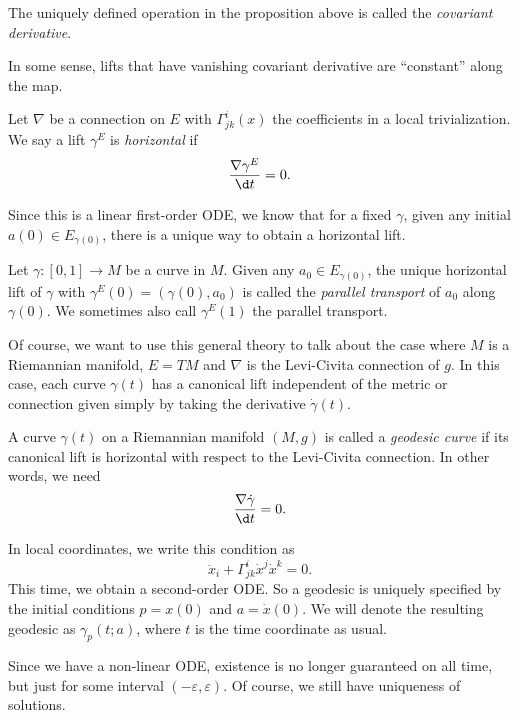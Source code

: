 \documentclass[a4paper]{article}
\begin{document}
\begin{defi}
  The uniquely defined operation in the proposition above is called the \emph{covariant derivative}.
\end{defi}

In some sense, lifts that have vanishing covariant derivative are ``constant'' along the map.

\begin{defi}
  Let $\nabla$ be a connection on $E$ with $\Gamma^i_{jk}(x)$ the coefficients in a local trivialization. We say a lift $\gamma^E$ is \emph{horizontal} if
  \[
    \frac{\nabla \gamma^E}{\d t} = 0.
  \]
\end{defi}
Since this is a linear first-order ODE, we know that for a fixed $\gamma$, given any initial $a(0) \in E_{\gamma(0)}$, there is a unique way to obtain a horizontal lift.

\begin{defi}
  Let $\gamma : [0, 1] \to M$ be a curve in $M$. Given any $a_0 \in E_{\gamma(0)}$, the unique horizontal lift of $\gamma$ with $\gamma^E(0) = (\gamma(0), a_0)$ is called the \emph{parallel transport} of $a_0$ along $\gamma(0)$. We sometimes also call $\gamma^E(1)$ the parallel transport.
\end{defi}
Of course, we want to use this general theory to talk about the case where $M$ is a Riemannian manifold, $E = TM$ and $\nabla$ is the Levi-Civita connection of $g$. In this case, each curve $\gamma(t)$ has a canonical lift independent of the metric or connection given simply by taking the derivative $\dot{\gamma}(t)$.
\begin{defi}[Geodesic]
  A curve $\gamma(t)$ on a Riemannian manifold $(M, g)$ is called a \emph{geodesic curve} if its canonical lift is horizontal with respect to the Levi-Civita connection. In other words, we need
  \[
    \frac{\nabla \dot{\gamma}}{\d t} = 0.
  \]
\end{defi}
In local coordinates, we write this condition as
\[
  \ddot{x}_i + \Gamma^i_{jk}\dot{x}^j \dot{x}^k = 0.
\]
This time, we obtain a second-order ODE. So a geodesic is uniquely specified by the initial conditions $p = x(0)$ and $a = \dot{x}(0)$. We will denote the resulting geodesic as $\gamma_p(t; a)$, where $t$ is the time coordinate as usual.

Since we have a non-linear ODE, existence is no longer guaranteed on all time, but just for some interval $(-\varepsilon, \varepsilon)$. Of course, we still have uniqueness of solutions.
\end{document}
